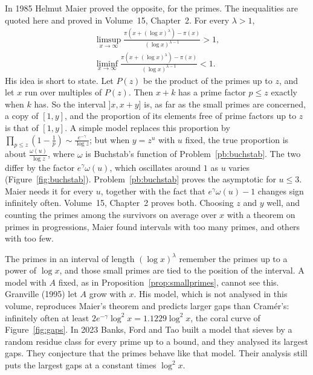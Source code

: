 \begin{remark}
In 1985 Helmut Maier proved the opposite, for the primes. The inequalities are quoted here and proved in Volume~15, Chapter~2. For every $\lambda>1$,
\[
\begin{gathered}\limsup_{x\to\infty}\frac{\pi(x+(\log x)^\lambda)-\pi(x)}{(\log x)^{\lambda-1}}>1,\\\liminf_{x\to\infty}\frac{\pi(x+(\log x)^\lambda)-\pi(x)}{(\log x)^{\lambda-1}}<1.\end{gathered}
\]
His idea is short to state. Let $P(z)$ be the product of the primes up to $z$, and let $x$ run over multiples of $P(z)$. Then $x+k$ has a prime factor $p\le z$ exactly when $k$ has. So the interval
$]x,x+y]$ is, as far as the small primes are concerned, a copy of $[1,y]$, and the proportion of its elements free of prime factors up to $z$ is that of $[1,y]$. A simple model replaces this proportion by
$\prod_{p\le z}(1-\frac1p)\sim\frac{e^{-\gamma}}{\log z}$; but when $y=z^u$ with $u$ fixed, the true proportion is about $\frac{\omega(u)}{\log z}$, where $\omega$ is Buchstab's function of Problem~\ref{pb:buchstab}. The two differ by the factor $e^\gamma\omega(u)$, which oscillates around $1$ as $u$ varies (Figure~\ref{fig:buchstab}). Problem~\ref{pb:buchstab} proves the asymptotic for $u\le3$. Maier needs it for every $u$, together with the fact that $e^\gamma\omega(u)-1$ changes sign infinitely often. Volume~15, Chapter~2 proves both.
Choosing $z$ and $y$ well, and counting the primes among the survivors on average over $x$ with a theorem on primes in progressions, Maier found intervals with too many primes, and others with too few.
\end{remark}

The primes in an interval of length $(\log x)^\lambda$ remember the primes up to a power of $\log x$, and those small primes are tied to the position of the interval. A model with $A$ fixed, as in Proposition~\ref{prop:smallprimes}, cannot see this. Granville (1995) let $A$ grow with $x$. His model, which is not analysed in this volume, reproduces Maier's theorem and predicts larger gaps than Cramér's: infinitely often at least $2e^{-\gamma}\log^2 x=1.1229\log^2 x$, the coral curve of Figure~\ref{fig:gaps}. In 2023 Banks, Ford and Tao built a model that sieves by a random residue class for every prime up to a bound, and they analysed its largest gaps. They conjecture that the primes behave like that model. Their analysis still puts the largest gaps at a constant times $\log^2 x$.

